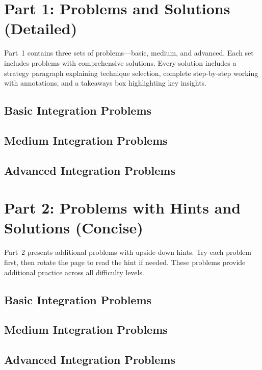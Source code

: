 \documentclass[12pt]{article}
\begin{document}


\newpage
\section{Part 1: Problems and Solutions (Detailed)}
Part~1 contains three sets of problems---basic, medium, and advanced. Each set includes problems with comprehensive solutions. Every solution includes a strategy paragraph explaining technique selection, complete step-by-step working with annotations, and a takeaways box highlighting key insights.

\subsection{Basic Integration Problems}


\subsection{Medium Integration Problems}


\subsection{Advanced Integration Problems}


\newpage
\section{Part 2: Problems with Hints and Solutions (Concise)}
Part~2 presents additional problems with upside-down hints. Try each problem first, then rotate the page to read the hint if needed. These problems provide additional practice across all difficulty levels.

\subsection{Basic Integration Problems}


\subsection{Medium Integration Problems}


\subsection{Advanced Integration Problems}

\end{document}
